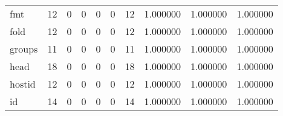 \begin{longtable}{lrrrrrrrrr}
fmt       &                                      12 &                                                  0 &                                                  0 &                                                  0 &                                                  0 &                                                 12 &                                           1.000000 &                               1.000000 &                             1.000000 \\
fold      &                                      12 &                                                  0 &                                                  0 &                                                  0 &                                                  0 &                                                 12 &                                           1.000000 &                               1.000000 &                             1.000000 \\
groups    &                                      11 &                                                  0 &                                                  0 &                                                  0 &                                                  0 &                                                 11 &                                           1.000000 &                               1.000000 &                             1.000000 \\
head      &                                      18 &                                                  0 &                                                  0 &                                                  0 &                                                  0 &                                                 18 &                                           1.000000 &                               1.000000 &                             1.000000 \\
hostid    &                                      12 &                                                  0 &                                                  0 &                                                  0 &                                                  0 &                                                 12 &                                           1.000000 &                               1.000000 &                             1.000000 \\
id        &                                      14 &                                                  0 &                                                  0 &                                                  0 &                                                  0 &                                                 14 &                                           1.000000 &                               1.000000 &                             1.000000 \\

\end{longtable}
